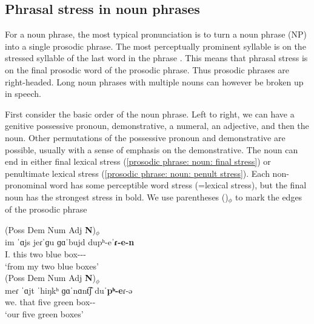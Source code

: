 \subsection{Phrasal stress in noun phrases}\label{section:intonation:phrase:noun}

For a noun phrase, the most typical pronunciation is to turn a noun phrase (NP) into a single prosodic phrase. The most perceptually prominent syllable is on the stressed syllable of the last word in the phrase 	\citep[24-5]{Abeghyan-1933-Meter}. This means that phrasal stress is on the final prosodic word of the prosodic phrase. Thus prosodic phrases are right-headed. Long noun phrases with multiple nouns can however be broken up in speech. 

First consider the basic order of the noun phrase. Left to right, we can have a genitive possessive pronoun, demonstrative, a numeral,  an adjective, and then the noun. Other permutations of the possessive pronoun and demonstrative are possible, usually with a sense of emphasis on the demonstrative.  The noun can end in either final lexical stress (\ref{prosodic phrase: noun: final stress}) or penultimate lexical stress  (\ref{prosodic phrase: noun: penult stress}). Each non-pronominal word has some perceptible word stress (=lexical stress), but the final noun has the strongest stress in bold. We use parentheses ()$_\phi$ to mark the edges of the prosodic phrase

\begin{exe}
	\ex 
	\begin{xlist}
		\ex \glll (Poss  Dem Num Adj \textbf{N})$_\phi$  \\
		im ˈɑjs jeɾˈɡu    ɡɑˈbujd  dupʰ-eˈ\textbf{ɾ-e-n}  \\
		I.{\gen} this two blue  box-{\pl}-{\abl}-{} \\
		\trans `from my two blue boxes'  \label{prosodic phrase: noun: final stress}\\ 
		\ex \glll (Poss  Dem Num Adj \textbf{N})$_\phi$  \\
		meɾ ˈɑjt ˈhiŋkʰ  ɡɑˈnɑnt͡ʃ  duˈ\textbf{pʰ-e}ɾ-ə\\
		we.{\gen} that five green box-{\pl}-{}  \\
		\trans `our five green boxes' \label{prosodic phrase: noun: penult stress}\\ 
		
	\end{xlist}
\end{exe}

